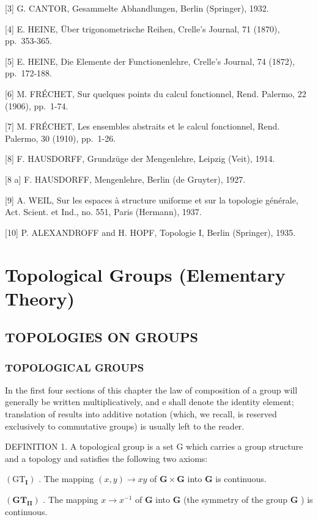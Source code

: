 {[}3{]} G. CANTOR, Gesammelte Abhandlungen, Berlin (Springer), 1932.

{[}4{]} E. HEINE, Über trigonometrische Reihen, Crelle's Journal, 71 (1870), pp.~353-365.

{[}5{]} E. HEINE, Die Elemente der Functionenlehre, Crelle's Journal, 74 (1872), pp.~172-188.

{[}6{]} M. FRÉCHET, Sur quelques points du calcul fonctionnel, Rend. Palermo, 22 (1906), pp.~1-74.

{[}7{]} M. FRÉCHET, Les ensembles abstraits et le calcul fonctionnel, Rend. Palermo, 30 (1910), pp.~1-26.

{[}8{]} F. HAUSDORFF, Grundzüge der Mengenlehre, Leipzig (Veit), 1914.

{[}8 a{]} F. HAUSDORFF, Mengenlehre, Berlin (de Gruyter), 1927.

{[}9{]} A. WEIL, Sur les espaces à structure uniforme et sur la topologie générale, Act. Scient. et Ind., no. 551, Paris (Hermann), 1937.

{[}10{]} P. ALEXANDROFF and H. HOPF, Topologie I, Berlin (Springer), 1935.

\chapter{Topological Groups (Elementary Theory)}

\section{TOPOLOGIES ON GROUPS}

\subsection{TOPOLOGICAL GROUPS}

In the first four sections of this chapter the law of composition of a group will generally be written multiplicatively, and e shall denote the identity element; translation of results into additive notation (which, we recall, is reserved exclusively to commutative groups) is usually left to the reader.

DEFINITION 1. A topological group is a set G which carries a group structure and a topology and satisfies the following two axioms:

\((\mathrm{GT}_{\mathbf{I}})\) . The mapping \((x, y) \to xy\) of \(\mathbf{G} \times \mathbf{G}\) into \(\mathbf{G}\) is continuous.

\((\mathbf{G}\mathbf{T}_{\mathbf{II}})\) . The mapping \(x \to x^{-1}\) of \(\mathbf{G}\) into \(\mathbf{G}\) (the symmetry of the group \(\mathbf{G}\) ) is continuous.

